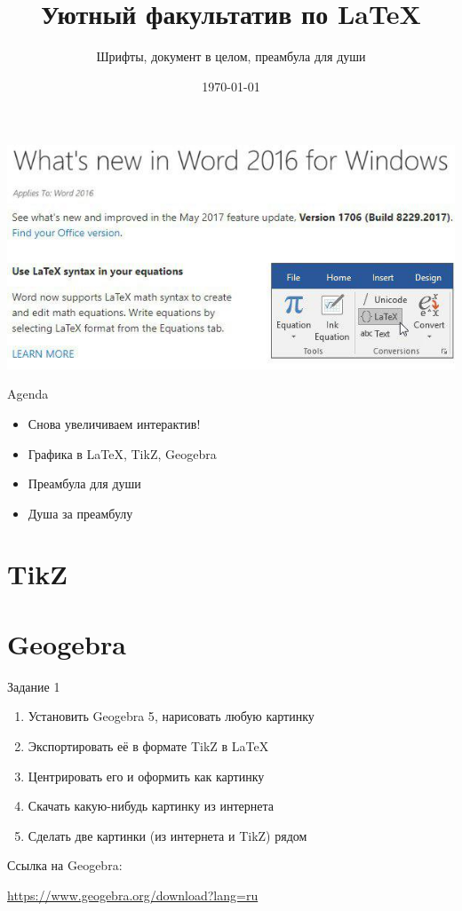 \documentclass[aspectratio=169]{beamer} %
\title{Уютный факультатив по \LaTeX}
\subtitle{Шрифты, документ в целом, преамбула для души}
\date{\today}
\begin{document}
\begingroup
{}
\begin{frame}[plain]
\centering  \includegraphics[width=0.95\linewidth]{new_word.jpg}	
\end{frame}
\endgroup 

\maketitle


\begin{frame}{Agenda} 
\begin{itemize}
	\item Снова увеличиваем интерактив!
	\item Графика в LaTeX, TikZ, Geogebra 
	\item Преамбула для души
	\item Душа за преамбулу 
\end{itemize}
\end{frame}


\section{TikZ} 

\section{Geogebra} 

\begin{frame}[plain]{Задание 1} 

\begin{enumerate}
	\item  Установить \alert{Geogebra 5}, нарисовать любую картинку
	\item  Экспортировать её в формате TikZ в \LaTeX
	\item  Центрировать его и оформить как картинку
	\item  Скачать какую-нибудь картинку из интернета
	\item  Сделать две картинки (из интернета и TikZ) рядом
\end{enumerate}

\begin{block}{Ссылка на Geogebra:}
	\vspace{3mm}
	\centerline {\url{ https://www.geogebra.org/download?lang=ru }}
	\vspace{3mm}
\end{block}
\end{frame}
\end{document}
